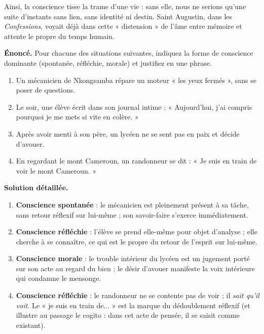 \documentclass[11pt]{article}
\newcounter{popsec}
\newcounter{popsub}
\newcommand{\courssub}[1]{%
  \stepcounter{popsub}%
  \par\vspace{9pt}\noindent{\popxbold\fontsize{11.5}{13}\selectfont\color{popink}{\color{poporange}\thepopsec.\thepopsub}\hspace{6pt}#1}\par\nopagebreak\vspace{4pt}
}
\begin{document}
Ainsi, la conscience tisse la trame d'une vie : sans elle, nous ne serions qu'une suite d'instants sans lien, sans identité ni destin. Saint Augustin, dans les \emph{Confessions}, voyait déjà dans cette « distension » de l'âme entre mémoire et attente le propre du temps humain.

\courssub{Exercice résolu et pièges}

\begin{exoresolu}
\textbf{Énoncé.} Pour chacune des situations suivantes, indiquez la forme de conscience dominante (spontanée, réfléchie, morale) et justifiez en une phrase.
\begin{enumerate}
\item Un mécanicien de Nkongsamba répare un moteur « les yeux fermés », sans se poser de questions.
\item Le soir, une élève écrit dans son journal intime : « Aujourd'hui, j'ai compris pourquoi je me mets si vite en colère. »
\item Après avoir menti à son père, un lycéen ne se sent pas en paix et décide d'avouer.
\item En regardant le mont Cameroun, un randonneur se dit : « Je suis en train de voir le mont Cameroun. »
\end{enumerate}
\tcblower
\textbf{Solution détaillée.}
\begin{enumerate}
\item \textbf{Conscience spontanée} : le mécanicien est pleinement présent à sa tâche, sans retour réflexif sur lui-même ; son savoir-faire s'exerce immédiatement.
\item \textbf{Conscience réfléchie} : l'élève se prend elle-même pour objet d'analyse ; elle cherche à se connaître, ce qui est le propre du retour de l'esprit sur lui-même.
\item \textbf{Conscience morale} : le trouble intérieur du lycéen est un jugement porté sur son acte au regard du bien ; le désir d'avouer manifeste la voix intérieure qui condamne le mensonge.
\item \textbf{Conscience réfléchie} : le randonneur ne se contente pas de voir ; il \emph{sait qu'il voit}. Le « je suis en train de... » est la marque du dédoublement réflexif (et illustre au passage le cogito : dans cet acte de pensée, il se saisit comme existant).
\end{enumerate}
\end{exoresolu}
\end{document}
